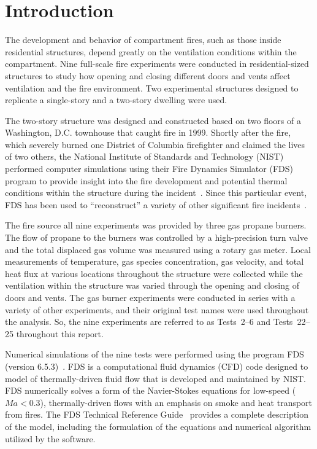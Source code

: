 
\renewcommand{\thechapter}{1}

\chapter{Introduction}
The development and behavior of compartment fires, such as those inside residential structures, depend greatly on the ventilation conditions within the compartment. Nine full-scale fire experiments were conducted in residential-sized structures to study how opening and closing different doors and vents affect ventilation and the fire environment. Two experimental structures designed to replicate a single-story and a two-story dwelling were used. 

The two-story structure was designed and constructed based on two floors of a Washington, D.C. townhouse that caught fire in 1999. Shortly after the fire, which severely burned one District of Columbia firefighter and claimed the lives of two others, the National Institute of Standards and Technology (NIST) performed computer simulations using their Fire Dynamics Simulator (FDS) program to provide insight into the fire development and potential thermal conditions within the structure during the incident~\cite{Madrzykowski:1}. Since this particular event, FDS has been used to ``reconstruct'' a variety of other significant fire incidents~\cite{NIST_NCSTAR_1-5F,Grosshandler:Station,Bryner:Charleston,Weinschenk:Chicago,Overholt:San_Francisco}.

The fire source all nine experiments was provided by three gas propane burners. The flow of propane to the burners was controlled by a high-precision turn valve and the total displaced gas volume was measured using a rotary gas meter. Local measurements of temperature, gas species concentration, gas velocity, and total heat flux at various locations throughout the structure were collected while the ventilation within the structure was varied through the opening and closing of doors and vents. The gas burner experiments were conducted in series with a variety of other experiments, and their original test names were used throughout the analysis. So, the nine experiments are referred to as Tests~2--6 and Tests~22--25 throughout this report.

Numerical simulations of the nine tests were performed using the program FDS (version 6.5.3)~\cite{FDS_Users_Guide}. FDS is a computational fluid dynamics (CFD) code designed to model of thermally-driven fluid flow that is developed and maintained by NIST. FDS numerically solves a form of the Navier-Stokes equations for low-speed ($Ma < 0.3$), thermally-driven flows with an emphasis on smoke and heat transport from fires. The FDS Technical Reference Guide~\cite{FDS_Tech_Guide} provides a complete description of the model, including the formulation of the equations and numerical algorithm utilized by the software. 

